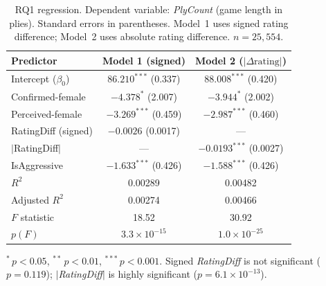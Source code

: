 \documentclass[11pt,a4paper]{article}
\begin{document}
\begin{table}[H]
\caption{RQ1 regression. Dependent variable: \textit{PlyCount} (game length in plies).
Standard errors in parentheses. Model~1 uses signed rating difference; Model~2 uses absolute
rating difference. $n=25{,}554$.}
\label{tab:rq1reg}
\centering
\begin{tabular}{lcc}
\toprule
Predictor & Model 1 (signed) & Model 2 ($|\Delta\text{rating}|$) \\
\midrule
Intercept ($\beta_0$)          & $86.210^{***}$ (0.337) & $88.008^{***}$ (0.420) \\
Confirmed-female               & $-4.378^{*}$ (2.007)   & $-3.944^{*}$ (2.002) \\
Perceived-female               & $-3.269^{***}$ (0.459) & $-2.987^{***}$ (0.460) \\
RatingDiff (signed)            & $-0.0026$ (0.0017)     & --- \\
$|$RatingDiff$|$               & ---                    & $-0.0193^{***}$ (0.0027) \\
IsAggressive                   & $-1.633^{***}$ (0.426) & $-1.588^{***}$ (0.426) \\
\midrule
$R^2$                          & 0.00289                & 0.00482 \\
Adjusted $R^2$                 & 0.00274                & 0.00466 \\
$F$ statistic                  & 18.52                  & 30.92 \\
$p(F)$                         & $3.3\times10^{-15}$    & $1.0\times10^{-25}$ \\
\bottomrule
\end{tabular}

\vspace{2pt}
{\footnotesize $^{*}\,p<0.05$, $^{**}\,p<0.01$, $^{***}\,p<0.001$.
Signed \textit{RatingDiff} is not significant ($p=0.119$); $|$\textit{RatingDiff}$|$ is highly
significant ($p=6.1\times10^{-13}$).}
\end{table}
\end{document}
